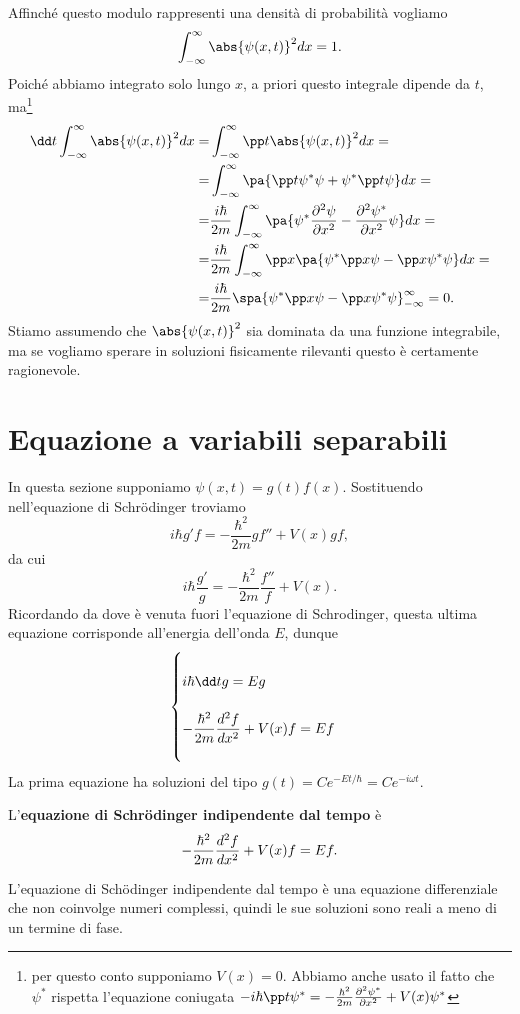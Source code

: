 \noindent Affinch\'e questo modulo rappresenti una densit\`a di probabilit\`a vogliamo
\[\int_{-\infty}^\infty\abs{\psi(x,t)}^2dx=1.\]
Poich\'e abbiamo integrato solo lungo $x$, a priori questo integrale dipende da $t$, ma\footnote{per questo conto supponiamo $V(x)=0$. Abbiamo anche usato il fatto che $\psi^\ast$ rispetta l'equazione coniugata $-i\hbar \pp t{\psi^\ast}=-\frac{\hbar^2}{2m}\pps[2]x{\psi^\ast} +V(x){\psi^\ast}$}
\begin{align*}
\dd t{}\int_{-\infty}^\infty \abs{\psi(x,t)}^2dx=&\int_{-\infty}^\infty \pp t{}\abs{\psi(x,t)}^2dx=\\
=&\int_{-\infty}^\infty\pa{\pp t{\psi^\ast}\psi+\psi^\ast\pp t{\psi}}dx=\\
=&\frac{i\hbar}{2m}\int_{-\infty}^\infty \pa{\psi^\ast\pps[2]x\psi-\pps[2]x{\psi^\ast}\psi}dx=\\
=&\frac{i\hbar}{2m}\int_{-\infty}^\infty \pp x{}\pa{\psi^\ast\pp x\psi-\pp x{\psi^\ast}\psi}dx=\\
=&\frac{i\hbar}{2m}\spa{\psi^\ast\pp x\psi-\pp x{\psi^\ast}\psi}^\infty_{-\infty}=0.
\end{align*}
Stiamo assumendo che $\abs{\psi(x,t)}^2$ sia dominata da una funzione integrabile, ma se vogliamo sperare in soluzioni fisicamente rilevanti questo \`e certamente ragionevole.

\section{Equazione a variabili separabili}
In questa sezione supponiamo $\psi(x,t)=g(t)f(x)$. Sostituendo nell'equazione di Schr\"odinger troviamo
\[i\hbar g'f=-\frac{\hbar^2}{2m}gf''+V(x)gf,\]
da cui
\[i\hbar \frac{g'}g=-\frac{\hbar^2}{2m}\frac{f''}f+V(x).\]
Ricordando da dove \`e venuta fuori l'equazione di Schrodinger, questa ultima equazione corrisponde all'energia dell'onda $E$, dunque
\[\begin{cases}
~\\
\displaystyle i\hbar \dd tg=Eg\\\\
\displaystyle-\frac{\hbar^2}{2m}\dds[2]xf+V(x)f=Ef\\~
\end{cases}\]
La prima equazione ha soluzioni del tipo $g(t)=Ce^{-Et/\hbar}=Ce^{-i\omega t}$. 

\begin{definition}
L'\textbf{equazione di Schr\"odinger indipendente dal tempo} \`e
\[-\frac{\hbar^2}{2m}\dds[2]xf+V(x)f=Ef.\]
\end{definition}
\begin{remark}
L'equazione di Sch\"odinger indipendente dal tempo \`e una equazione differenziale che non coinvolge numeri complessi, quindi le sue soluzioni sono reali a meno di un termine di fase.
\end{remark}



